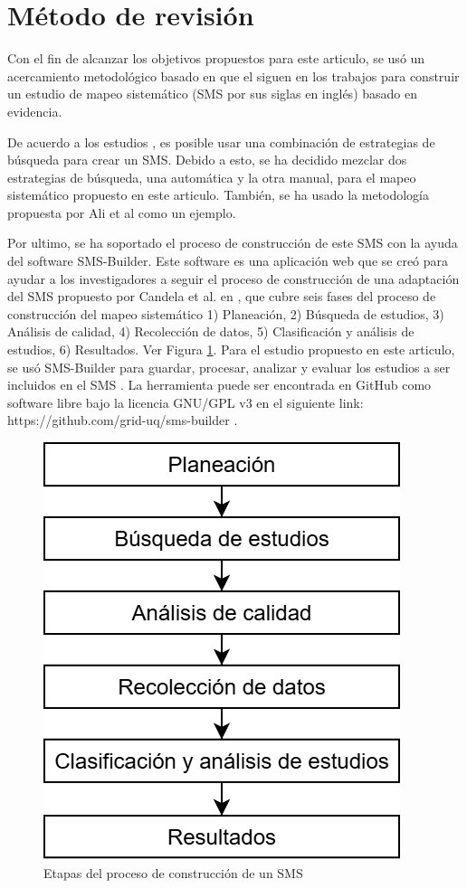 \section{Método de revisión}\label{sec:metodo-revision}
Con el fin de alcanzar los objetivos propuestos para este articulo, se usó un acercamiento metodológico basado en que el siguen en los trabajos \cite{Kitchenham2010792, budgen2008using} para construir un estudio de mapeo sistemático (SMS por sus siglas en inglés) basado en evidencia.

De acuerdo a los estudios \cite{Erica2017HybridSS, Nguyen201562}, es posible usar una combinación de estrategias de búsqueda para crear un SMS. Debido a esto, se ha decidido mezclar dos estrategias de búsqueda, una automática y la otra manual, para el mapeo sistemático propuesto en este articulo. También, se ha usado la metodología propuesta por Ali et al \cite{Ali201988196} como un ejemplo.

Por ultimo, se ha soportado el proceso de construcción de este SMS con la ayuda del software SMS-Builder. Este software es una aplicación web que se creó para ayudar a los investigadores a seguir el proceso de construcción de una adaptación del SMS propuesto por Candela et al. en \cite{Kitchenham2010792}, que cubre seis fases del proceso de construcción del mapeo sistemático 1) Planeación, 2) Búsqueda de estudios, 3) Análisis de calidad, 4) Recolección de datos, 5) Clasificación y análisis de estudios, 6) Resultados. Ver Figura \ref{figure:Stages}. Para el estudio propuesto en este articulo, se usó SMS-Builder para guardar, procesar, analizar y evaluar los estudios a ser incluidos en el SMS \cite{Candela2022100935}. La herramienta puede ser encontrada en GitHub como software libre bajo la licencia GNU/GPL v3 en el siguiente link: https://github.com/grid-uq/sms-builder \cite{Candela2022100935}.

\begin{figure}[htbp]
	\centering
	\includegraphics[width=0.6\linewidth]{resources/figures/sms-Etapas.drawio.png}
	\caption{Etapas del proceso de construcción de un SMS}
	\label{figure:Stages}
\end{figure}

